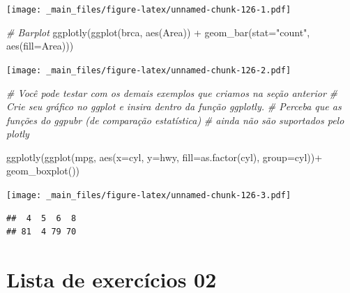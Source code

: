 \documentclass[
]{book}
\newenvironment{Shaded}{\begin{snugshade}}{\end{snugshade}}
\newcommand{\AttributeTok}[1]{\textcolor[rgb]{0.77,0.63,0.00}{#1}}
\newcommand{\CommentTok}[1]{\textcolor[rgb]{0.56,0.35,0.01}{\textit{#1}}}
\newcommand{\FunctionTok}[1]{\textcolor[rgb]{0.00,0.00,0.00}{#1}}
\newcommand{\NormalTok}[1]{#1}
\newcommand{\SpecialCharTok}[1]{\textcolor[rgb]{0.00,0.00,0.00}{#1}}
\newcommand{\StringTok}[1]{\textcolor[rgb]{0.31,0.60,0.02}{#1}}
\begin{document}
\texttt{[image: \_main\_files/figure-latex/unnamed-chunk-126-1.pdf]}

\begin{Shaded}
\begin{Highlighting}[]
\CommentTok{\# Barplot}
\FunctionTok{ggplotly}\NormalTok{(}\FunctionTok{ggplot}\NormalTok{(brca,}
                \FunctionTok{aes}\NormalTok{(Area)) }\SpecialCharTok{+}
           \FunctionTok{geom\_bar}\NormalTok{(}\AttributeTok{stat=}\StringTok{"count"}\NormalTok{, }\FunctionTok{aes}\NormalTok{(}\AttributeTok{fill=}\NormalTok{Area)))}
\end{Highlighting}
\end{Shaded}

\texttt{[image: \_main\_files/figure-latex/unnamed-chunk-126-2.pdf]}

\begin{Shaded}
\begin{Highlighting}[]
\CommentTok{\# Você pode testar com os demais exemplos que criamos na seção anterior}
\CommentTok{\# Crie seu gráfico no ggplot e insira dentro da função ggplotly.}
\CommentTok{\# Perceba que as funções do ggpubr (de comparação estatística)}
\CommentTok{\# ainda não são suportados pelo plotly}

\FunctionTok{ggplotly}\NormalTok{(}\FunctionTok{ggplot}\NormalTok{(mpg, }\FunctionTok{aes}\NormalTok{(}\AttributeTok{x=}\NormalTok{cyl, }\AttributeTok{y=}\NormalTok{hwy, }\AttributeTok{fill=}\FunctionTok{as.factor}\NormalTok{(cyl), }\AttributeTok{group=}\NormalTok{cyl))}\SpecialCharTok{+}
           \FunctionTok{geom\_boxplot}\NormalTok{())}
\end{Highlighting}
\end{Shaded}

\texttt{[image: \_main\_files/figure-latex/unnamed-chunk-126-3.pdf]}

\begin{Shaded}
\end{Shaded}

\begin{verbatim}
##  4  5  6  8 
## 81  4 79 70
\end{verbatim}

\hypertarget{lista-de-exercuxedcios-02}{%
\section{Lista de exercícios 02}\label{lista-de-exercuxedcios-02}}
\end{document}
